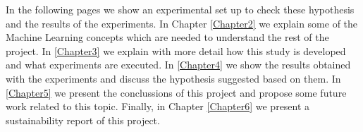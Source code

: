 \begin{pre-delivery}
  In the following pages we show an experimental set up to check these
  hypothesis and the results of the experiments. In Chapter \ref{Chapter2} we
  explain some of the Machine Learning concepts which are needed to understand
  the rest of the project. In \ref{Chapter3} we explain with more detail how
  this study is developed and what experiments are executed. In \ref{Chapter4}
  we show the results obtained with the experiments and discuss the hypothesis
  suggested based on them. In \ref{Chapter5} we present the conclussions of
  this project and propose some future work related to this topic. Finally,
  in Chapter \ref{Chapter6} we present a sustainability report of this project.

\end{pre-delivery}
